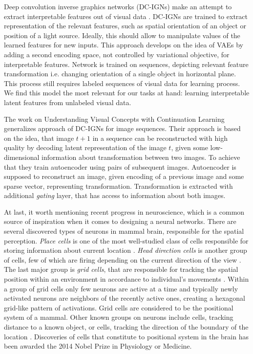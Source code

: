 Deep convolution inverse graphics networks (DC-IGNs) make an attempt to extract interpretable features out of visual data \cite{Kulkarni2015}.
DC-IGNs are trained to extract representation of the relevant features, such as spatial orientation of an object or position of a light source. Ideally, this should allow to manipulate values of the learned features for new inputs. This approach develops on the idea of VAEs by adding a second encoding space, not controlled by variational objective, for interpretable features. Network is trained on sequences, depicting relevant feature transformation i.e. changing orientation of a single object in horizontal plane. This process still requires labeled sequences of visual data for learning process. We find this model the most relevant for our tasks at hand: learning interpretable latent features from unlabeled visual data.

The work on Understanding Visual Concepts with Continuation Learning \cite{Whitney2016} generalizes approach of DC-IGNs for image sequences. Their approach is based on the idea, that image $t+1$ in a sequence can be reconstructed with high quality by decoding latent representation of the image $t$, given some low-dimensional information about transformation between two images. To achieve that they train autoencoder using pairs of subsequent images. Autoencoder is supposed to reconstruct an image, given encoding of a previous image and some sparse vector, representing transformation. Transformation is extracted with additional \textit{gating} layer, that has access to information about both images.

At last, it worth mentioning recent progress in neuroscience, which is a common source of inspiration when it comes to designing a neural networks. There are several discovered types of neurons in mammal brain, responsible for the spatial perception. \textit{Place cells} is one of the most well-studied class of cells responsible for storing information about current location \cite{Fenton2009, Hartley2014}. \textit{Head direction cells} is another group of cells, few of which are firing depending on the current direction of the view \cite{Taube1990, Taube1990a}. The last major group is \textit{grid cells}, that are responsible for tracking the spatial position within an environment in accordance to individual's movements \cite{Moser2008}. Within a group of grid cells only few neurons are active at a time and typically newly activated neurons are neighbors of the recently active ones, creating a hexagonal grid-like pattern of activations. Grid cells are considered to be the positional system of a mammal. Other known groups on neurons include cells, tracking distance to a known object, or cells, tracking the direction of the boundary of the location \cite{Lever2009}. Discoveries of cells that constitute to positional system in the brain has been awarded the 2014 Nobel Prize in Physiology or Medicine.
